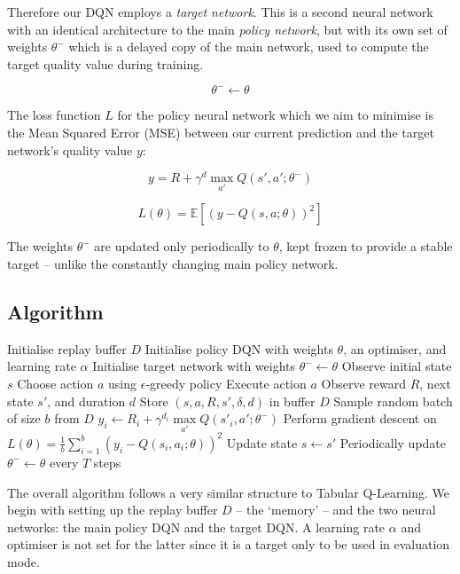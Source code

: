 \documentclass[a4paper]{report}
\begin{document}
Therefore our DQN employs a \emph{target network}. This is a second neural network with an identical architecture to the main \emph{policy network}, but with its own set of weights $\theta^-$ which is a delayed copy of the main network, used to compute the target quality value during training.

$$\theta^- \leftarrow \theta$$

The loss function $L$ for the policy neural network which we aim to minimise is the Mean Squared Error (MSE) between our current prediction and the target network's quality value $y$:

$$y=R + \gamma^d \max_{a'} Q(s', a'; \theta^-)$$

$$L(\theta) = \mathbb{E}\left[\left(y - Q(s, a; \theta)\right)^2\right]$$

The weights $\theta^-$ are updated only periodically to $\theta$, kept frozen to provide a stable target -- unlike the constantly changing main policy network.

\subsection{Algorithm}

\begin{algorithm}[H]
  \caption{Deep Q-Learning}
  \begin{algorithmic}[1]
  \State Initialise replay buffer $D$
  \State Initialise policy DQN with weights $\theta$, an optimiser, and learning rate $\alpha$
  \State Initialise target network with weights $\theta^- \leftarrow \theta$
    \State Observe initial state $s$
      \State Choose action $a$ using $\epsilon$-greedy policy
      \State Execute action $a$
      \State Observe reward $R$, next state $s'$, and duration $d$
      \State Store $(s,a,R,s',\delta,d)$ in buffer $D$
      \State Sample random batch of size $b$ from $D$
        \State $y_i \leftarrow R_i + \gamma^{d_i} \underset{a'}\max Q(s'_i,a';\theta^-)$
      \EndFor
      \State Perform gradient descent on $L(\theta) = \frac{1}{b} \sum_{i=1}^{b} \left(y_i - Q(s_i, a_i; \theta)\right)^2$
      \State Update state $s \leftarrow s'$
      \State Periodically update $\theta^- \leftarrow \theta$ every $T$ steps
    \EndFor
  \EndFor
  \end{algorithmic}
\end{algorithm}

The overall algorithm follows a very similar structure to Tabular Q-Learning. We begin with setting up the replay buffer $D$ -- the `memory' -- and the two neural networks: the main policy DQN and the target DQN. A learning rate $\alpha$ and optimiser is not set for the latter since it is a target only to be used in evaluation mode.
\end{document}
